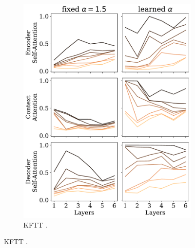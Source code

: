 \begin{figure}[!htbp]
\begin{subfigure}[b]{.49\linewidth}
        \includegraphics[width=\linewidth]{Figures/head_density_per_layer_ja.pdf}
        \caption{%
            \label{fig:head_density_per_layer_ja}%
            KFTT .}
    \end{subfigure}


\end{figure}
